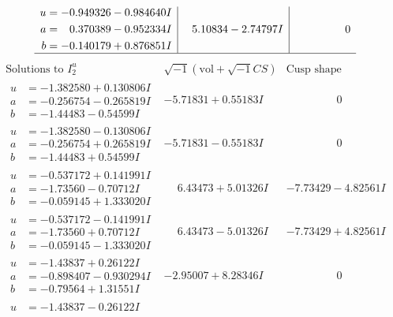 \documentclass[1p]{elsarticle_modified}
\theoremstyle{definition}
\newcommand{\I}{\sqrt{-1}}
\begin{document}
$$\begin{array}{c|c|c}
\begin{aligned}
u &= -0.949326 - 0.984640 I \\
a &= \phantom{-}0.370389 - 0.952334 I \\
b &= -0.140179 + 0.876851 I\end{aligned}
 & \phantom{-}5.10834 - 2.74797 I & \phantom{-0.000000 } 0\\
 \hline 
 \end{array}$$\newpage$$\begin{array}{c|c|c}  
\text{Solutions to }I^u_{2}& \I (\text{vol} + \sqrt{-1}CS) & \text{Cusp shape}\\
 \hline 
\begin{aligned}
u &= -1.382580 + 0.130806 I \\
a &= -0.256754 - 0.265819 I \\
b &= -1.44483 - 0.54599 I\end{aligned}
 & -5.71831 + 0.55183 I & \phantom{-0.000000 } 0 \\ \hline\begin{aligned}
u &= -1.382580 - 0.130806 I \\
a &= -0.256754 + 0.265819 I \\
b &= -1.44483 + 0.54599 I\end{aligned}
 & -5.71831 - 0.55183 I & \phantom{-0.000000 } 0 \\ \hline\begin{aligned}
u &= -0.537172 + 0.141991 I \\
a &= -1.73560 - 0.70712 I \\
b &= -0.059145 + 1.333020 I\end{aligned}
 & \phantom{-}6.43473 + 5.01326 I & -7.73429 - 4.82561 I \\ \hline\begin{aligned}
u &= -0.537172 - 0.141991 I \\
a &= -1.73560 + 0.70712 I \\
b &= -0.059145 - 1.333020 I\end{aligned}
 & \phantom{-}6.43473 - 5.01326 I & -7.73429 + 4.82561 I \\ \hline\begin{aligned}
u &= -1.43837 + 0.26122 I \\
a &= -0.898407 - 0.930294 I \\
b &= -0.79564 + 1.31551 I\end{aligned}
 & -2.95007 + 8.28346 I & \phantom{-0.000000 } 0 \\ \hline\begin{aligned}
u &= -1.43837 - 0.26122 I \\

\end{aligned}
\end{array}$$
\end{document}
